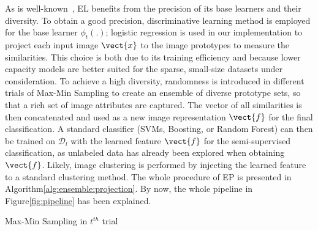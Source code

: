 \documentclass[preprint,12pt,3p]{elsarticle}
\begin{document}
As is well-known~\citep{zhou:ensemble}, EL benefits from the precision of its base learners
and their diversity.  
To obtain a good precision, discriminative learning method is employed for the
base learner $\phi_t(.)$; logistic regression is used in our
implementation to project each input image $\vect{x}$ to the image
prototypes to measure the similarities. This choice is both due to its
training efficiency and because lower capacity models are better suited
for the sparse, small-size datasets under consideration.  To achieve a high
diversity, randomness is introduced in different trials of Max-Min
Sampling to create an ensemble of diverse prototype sets, so that a
rich set of image attributes are captured.
The vector of all similarities is then concatenated and used as a new
image representation $\vect{f}$ for the final classification. A
standard classifier (\eg SVMs, Boosting, or Random Forest) can then be
trained on $\mathcal{D}_l$ with the learned feature $\vect{f}$ for the
semi-supervised classification, as unlabeled data has already been
explored when obtaining $\vect{f}$. Likely, image clustering is
performed by injecting the learned feature to a standard clustering
method.  The whole procedure of EP is presented in
Algorithm\ref{alg:ensemble:projection}.  By now, the whole pipeline in
Figure\ref{fig:pipeline} has been explained.

\begin{algorithm}[!t]\small
\caption{Max-Min Sampling in $t^{th}$ trial}
\label{alg:max-min}
\end{algorithm}
\end{document}
